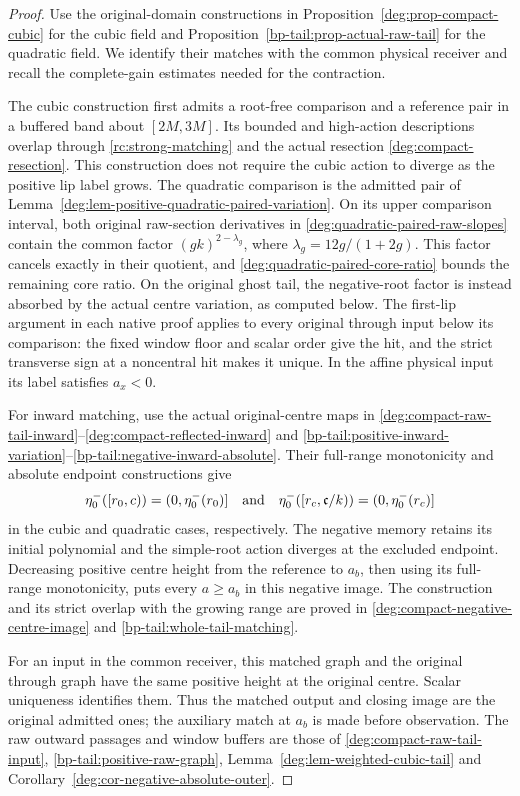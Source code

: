 \begin{proof}
Use the original-domain constructions in
Proposition~\ref{deg:prop-compact-cubic} for the cubic field and
Proposition~\ref{bp-tail:prop-actual-raw-tail} for the quadratic
field. We identify their matches with the common physical receiver
and recall the complete-gain estimates needed for the contraction.

The cubic construction first admits a root-free comparison and a
reference pair in a buffered band about \([2M,3M]\). Its bounded
and high-action descriptions overlap through
\eqref{rc:strong-matching} and the actual resection
\eqref{deg:compact-resection}. This construction does not require
the cubic action to diverge as the positive lip label grows.
The quadratic comparison is the admitted pair of
Lemma~\ref{deg:lem-positive-quadratic-paired-variation}.
On its upper comparison interval, both original raw-section derivatives
in \eqref{deg:quadratic-paired-raw-slopes} contain the common factor
\((gk)^{2-\lambda_g}\), where \(\lambda_g=12g/(1+2g)\).
This factor cancels exactly in their quotient, and
\eqref{deg:quadratic-paired-core-ratio} bounds the remaining core ratio.
On the original ghost tail, the negative-root factor is instead
absorbed by the actual centre variation, as computed below.
The first-lip argument in each native proof applies to every original
through input below its comparison: the fixed window floor and scalar
order give the hit, and the strict transverse sign at a noncentral hit
makes it unique. In the affine physical input its label satisfies
\(a_x<0\).

For inward matching, use the actual original-centre maps in
\eqref{deg:compact-raw-tail-inward}--\eqref{deg:compact-reflected-inward}
and
\eqref{bp-tail:positive-inward-variation}--\eqref{bp-tail:negative-inward-absolute}.
Their full-range monotonicity and absolute endpoint constructions give
\[
 \eta_0^-([r_0,c))=(0,\eta_0^-(r_0)]\quad\hbox{and}\quad
 \eta_0^-([r_c,\mathfrak c/k))=(0,\eta_0^-(r_c)]
\]
in the cubic and quadratic cases, respectively. The negative memory
retains its initial polynomial and the simple-root action diverges at
the excluded endpoint. Decreasing positive centre height from the
reference to \(a_b\), then using its full-range monotonicity, puts
every \(a\ge a_b\) in this negative image. The construction and
its strict overlap with the growing range are proved in
\eqref{deg:compact-negative-centre-image} and
\eqref{bp-tail:whole-tail-matching}.

For an input in the common receiver, this matched graph and the
original through graph have the same positive height at the original
centre. Scalar uniqueness identifies them. Thus the matched output and
closing image are the original admitted ones; the auxiliary match at
\(a_b\) is made before observation. The raw outward passages and
window buffers are those of \eqref{deg:compact-raw-tail-input},
\eqref{bp-tail:positive-raw-graph},
Lemma~\ref{deg:lem-weighted-cubic-tail} and
Corollary~\ref{deg:cor-negative-absolute-outer}.


\end{proof}
